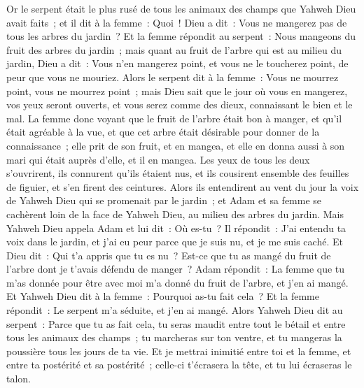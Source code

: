 \begin{multicols}{2}
\VerseOne{}Or le serpent était le plus rusé de tous les animaux des champs que Yahweh Dieu avait faits~; et il dit à la femme~: Quoi~! Dieu a dit~: Vous ne mangerez pas de tous les arbres du jardin~?
Et la femme répondit au serpent~: Nous mangeons du fruit des arbres du jardin~;
mais quant au fruit de l'arbre qui est au milieu du jardin, Dieu a dit~: Vous n'en mangerez point, et vous ne le toucherez point, de peur que vous ne mouriez.
Alors le serpent dit à la femme~: Vous ne mourrez point, vous ne mourrez point~;
mais Dieu sait que le jour où vous en mangerez, vos yeux seront ouverts, et vous serez comme des dieux, connaissant le bien et le mal.
La femme donc voyant que le fruit de l'arbre était bon à manger, et qu'il était agréable à la vue, et que cet arbre était désirable pour donner de la connaissance~; elle prit de son fruit, et en mangea, et elle en donna aussi à son mari qui était auprès d'elle, et il en mangea.
Les yeux de tous les deux s'ouvrirent, ils connurent qu'ils étaient nus, et ils cousirent ensemble des feuilles de figuier, et s'en firent des ceintures.
Alors ils entendirent au vent du jour la voix de Yahweh Dieu qui se promenait par le jardin~; et Adam et sa femme se cachèrent loin de la face de Yahweh Dieu, au milieu des arbres du jardin.
Mais Yahweh Dieu appela Adam et lui dit~: Où es-tu~?
Il répondit~: J'ai entendu ta voix dans le jardin, et j'ai eu peur parce que je suis nu, et je me suis caché.
Et Dieu dit~: Qui t'a appris que tu es nu~? Est-ce que tu as mangé du fruit de l'arbre dont je t'avais défendu de manger~?
Adam répondit~: La femme que tu m'as donnée pour être avec moi m'a donné du fruit de l'arbre, et j'en ai mangé.
Et Yahweh Dieu dit à la femme~: Pourquoi as-tu fait cela~? Et la femme répondit~: Le serpent m'a séduite, et j'en ai mangé.
Alors Yahweh Dieu dit au serpent~: Parce que tu as fait cela, tu seras maudit entre tout le bétail et entre tous les animaux des champs~; tu marcheras sur ton ventre, et tu mangeras la poussière tous les jours de ta vie.
Et je mettrai inimitié entre toi et la femme, et entre ta postérité et sa postérité~; celle-ci t'écrasera la tête, et tu lui écraseras le talon.

\end{multicols}
